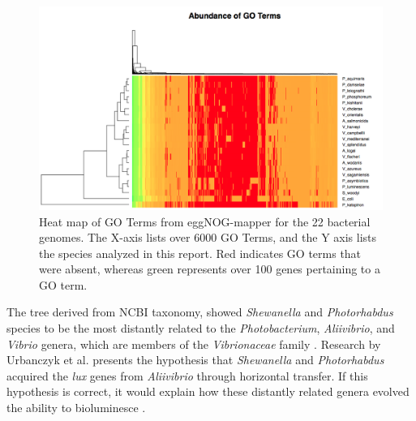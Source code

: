 \documentclass[fleqn,12pt]{wlscirep}
\begin{document}
\begin{figure}[ht]
\includegraphics[width=\textwidth]{3.png}
\caption{Heat map of GO Terms from eggNOG-mapper for the 22 bacterial genomes. The X-axis lists over 6000 GO Terms, and the Y axis lists the species analyzed in this report. Red indicates GO terms that were absent, whereas green represents over 100 genes pertaining to a GO term.}
\centering
\label{fig3}
\end{figure}

The tree derived from NCBI taxonomy, showed \textit{Shewanella} and \textit{Photorhabdus} species to be the most distantly related to the \textit{Photobacterium}, \textit{Aliivibrio}, and \textit{Vibrio} genera, which are members of the \textit{Vibrionaceae} family \cite{t2}. Research by Urbanczyk et al. presents the hypothesis that \textit{Shewanella} and \textit{Photorhabdus} acquired the \textit{lux} genes from \textit{Aliivibrio} through horizontal transfer. If this hypothesis is correct, it would explain how these distantly related genera evolved the ability to bioluminesce \cite{t2}.
\end{document}
